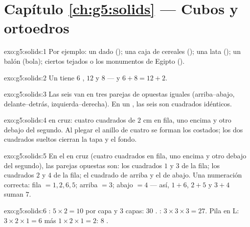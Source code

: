 \section*{Capítulo \ref{ch:g5:solids} --- Cubos y ortoedros}

\begin{solution}{exo:g5:solids:1}
Por ejemplo: un dado (); una caja de cereales (); una lata (); un
balón (bola); ciertos tejados o los monumentos de Egipto
().
\end{solution}

\begin{solution}{exo:g5:solids:2}
Un  tiene $6$ , $12$  y $8$  --- y
$6 + 8 = 12 + 2$. \checkmark
\end{solution}

\begin{solution}{exo:g5:solids:3}
Las seis  van en tres parejas de  opuestas iguales
(arriba--abajo, delante--detrás, izquierda--derecha). En un , las seis 
son cuadrados idénticos.
\end{solution}

\begin{solution}{exo:g5:solids:4}
 en cruz: cuatro cuadrados de $2$ cm en fila, uno encima y otro
debajo del segundo. Al plegar el anillo de cuatro se forman los costados;
los dos cuadrados sueltos cierran la tapa y el fondo.
\end{solution}

\begin{solution}{exo:g5:solids:5}
En el  en cruz (cuatro cuadrados en fila, uno encima y otro debajo del
segundo), las parejas opuestas son: los cuadrados $1$ y $3$ de la fila;
los cuadrados $2$ y $4$ de la fila; el cuadrado de arriba y el de abajo. Una
numeración correcta: fila $= 1, 2, 6, 5$; arriba $= 3$; abajo $= 4$
--- así, $1{+}6$, $2{+}5$ y $3{+}4$ suman $7$.
\end{solution}

\begin{solution}{exo:g5:solids:6}
: $5 \times 2 = 10$ por capa y $3$ capas: $30$ . :
$3 \times 3 \times 3 = 27$. Pila en L: $3 \times 2 \times 1 = 6$ más
$1 \times 2 \times 1 = 2$: $8$ .
\end{solution}


